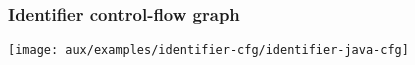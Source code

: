 \begin{frame}[hasprev=false ,hasnext=false, c]
\frametitle{Identifier control-flow graph}
\label{example:identifier-cfg}

	\begin{block:fact}{}
		\texttt{[image: aux/examples/identifier-cfg/identifier-java-cfg]}
	\end{block:fact}
\end{frame}
